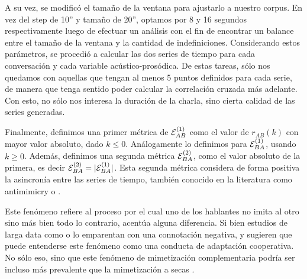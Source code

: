 A su vez, se modificó el tamaño de la ventana para ajustarlo a nuestro corpus. En vez del step de 10'' y tamaño de 20'', optamos por 8 y 16 segundos respectivamente luego de efectuar un análisis con el fin de encontrar un balance entre el tamaño de la ventana y la cantidad de indefiniciones. Considerando estos parámetros, se procedió a calcular las dos series de tiempo para cada conversación y cada variable acústico-prosódica. De estas tareas, sólo nos quedamos con aquellas que tengan al menos 5 puntos definidos para cada serie, de manera que tenga sentido poder calcular la correlación cruzada más adelante. Con esto, no sólo nos interesa la duración de la charla, sino cierta calidad de las series generadas.

Finalmente, definimos una primer métrica de \entrainment $\mathcal{E}_{AB}^{(1)}$ como el valor de $r_{AB}(k)$ con mayor valor absoluto, dado $k \leq 0$. Análogamente lo definimos para $\mathcal{E}_{BA}^{(1)}$, usando $k \geq 0$. Además, definimos una segunda métrica $\mathcal{E}_{BA}^{(2)}$, como el valor absoluto de la primera, es decir $\mathcal{E}_{BA}^{(2)} = |\mathcal{E}_{BA}^{(1)}|$. Esta segunda métrica considera de forma positiva la asincronía entre las series de tiempo, también conocido en la literatura como antimimicry o \disentrainment\cite{CHAR1999}.

Este fenómeno refiere al proceso por el cual uno de los hablantes no imita al otro sino más bien todo lo contrario, acentúa alguna diferencia. Si bien estudios de larga data como \cite{bourhis1973language} o \cite{dabbs1969similarity} lo emparentan con una connotación negativa, \cite{healey2014divergence} y \cite{levitan2015acoustic} sugieren que puede entenderse este fenómeno como una conducta de adaptación cooperativa. No sólo eso, sino que este fenómeno de mimetización complementaria podría ser incluso más prevalente que la mimetización a secas \cite{levitan2015acoustic}.
